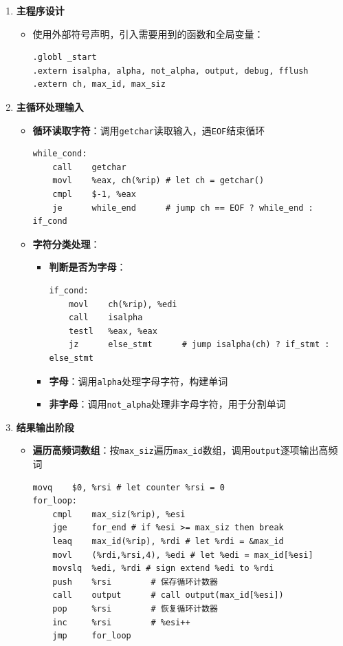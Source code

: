 \documentclass[10pt,a4paper]{article}
\begin{document}
\begin{enumerate}
    \item \textbf{主程序设计}
    \begin{itemize}
        \item 使用外部符号声明，引入需要用到的函数和全局变量：
        \begin{lstlisting}[language={[x86masm]Assembler}]
.globl _start
.extern isalpha, alpha, not_alpha, output, debug, fflush
.extern ch, max_id, max_siz
        \end{lstlisting}
    \end{itemize}
    
    \item \textbf{主循环处理输入}
    \begin{itemize}
        \item \textbf{循环读取字符}：调用\verb|getchar|读取输入，遇\verb|EOF|结束循环
        \begin{lstlisting}[language={[x86masm]Assembler}]
while_cond:
    call    getchar
    movl    %eax, ch(%rip) # let ch = getchar()
    cmpl    $-1, %eax
    je      while_end      # jump ch == EOF ? while_end : if_cond
        \end{lstlisting}
        
        \item \textbf{字符分类处理}：
        \begin{itemize}
            \item \textbf{判断是否为字母}：
            \begin{lstlisting}[language={[x86masm]Assembler}]
if_cond:
    movl    ch(%rip), %edi
    call    isalpha
    testl   %eax, %eax
    jz      else_stmt      # jump isalpha(ch) ? if_stmt : else_stmt
            \end{lstlisting}
            
            \item \textbf{字母}：调用\verb|alpha|处理字母字符，构建单词
            \item \textbf{非字母}：调用\verb|not_alpha|处理非字母字符，用于分割单词
        \end{itemize}
    \end{itemize}
    
    \item \textbf{结果输出阶段}
    \begin{itemize}
        \item \textbf{遍历高频词数组}：按\verb|max_siz|遍历\verb|max_id|数组，调用\verb|output|逐项输出高频词
        \begin{lstlisting}[language={[x86masm]Assembler}]
    movq    $0, %rsi # let counter %rsi = 0
for_loop:
    cmpl    max_siz(%rip), %esi
    jge     for_end # if %esi >= max_siz then break
    leaq    max_id(%rip), %rdi # let %rdi = &max_id
    movl    (%rdi,%rsi,4), %edi # let %edi = max_id[%esi]
    movslq  %edi, %rdi # sign extend %edi to %rdi
    push    %rsi        # 保存循环计数器
    call    output      # call output(max_id[%esi])
    pop     %rsi        # 恢复循环计数器
    inc     %rsi        # %esi++
    jmp     for_loop
        \end{lstlisting}
    \end{itemize}
    

\end{enumerate}
\end{document}
